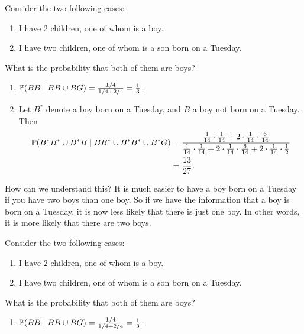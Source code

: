\begin{note}
  \begin{field}
    \begin{eg}
      Consider the two following cases:
      \begin{enumerate}
        \item I have 2 children, one of whom is a boy.
        \item I have two children, one of whom is a son born on a Tuesday.
      \end{enumerate}
      What is the probability that both of them are boys?
      \begin{enumerate}
        \item $\P(BB\mid BB\cup BG) = \frac{1/4}{1/4 + 2/4} = \frac{1}{3}$.
        \item Let $B^*$ denote a boy born on a Tuesday, and $B$ a boy not born on a Tuesday. Then
          \begin{align*}
            \P(B^*B^* \cup B^*B\mid BB^* \cup B^*B^*\cup B^*G)&=\frac{\frac{1}{14}\cdot \frac{1}{14} + 2\cdot \frac{1}{14}\cdot\frac{6}{14}}{\frac{1}{14}\cdot \frac{1}{14} + 2\cdot \frac{1}{14}\cdot\frac{6}{14} + 2\cdot \frac{1}{14}\cdot \frac{1}{2}}\\
            &= \frac{13}{27}.
          \end{align*}
      \end{enumerate}
      How can we understand this? It is much easier to have a boy born on a Tuesday if you have two boys than one boy. So if we have the information that a boy is born on a Tuesday, it is now less likely that there is just one boy. In other words, it is more likely that there are two boys.
    \end{eg}
  \end{field}
  \begin{field}
    \begin{eg}
      Consider the two following cases:
      \begin{enumerate}
        \item I have 2 children, one of whom is a boy.
        \item I have two children, one of whom is a son born on a Tuesday.
      \end{enumerate}
      What is the probability that both of them are boys?
      \begin{enumerate}
        \item $\P(BB\mid BB\cup BG) = \frac{1/4}{1/4 + 2/4} = \frac{1}{3}$.

\end{enumerate}
\end{eg}
\end{field}
\end{note}
